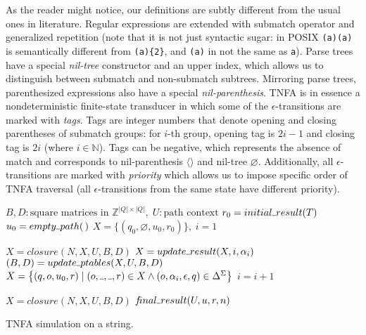 \documentclass[AMA,STIX1COL]{WileyNJD-v2}
\newcommand{\Xm}{\langle\!\rangle}
\newcommand{\Xund}{\rule{.4em}{.4pt}}
\newcommand{\YN}{\mathbb{N}}
\newcommand{\YZ}{\mathbb{Z}}
\begin{document}
As the reader might notice, our definitions are subtly different from the usual ones in literature.
Regular expressions are extended with submatch operator
and generalized repetition (note that it is not just syntactic sugar: in POSIX \texttt{(a)(a)} is semantically different from \texttt{(a)\{2\}},
and \texttt{(a)} in not the same as \texttt{a}).
Parse trees have a special \emph{nil-tree} constructor
and an upper index, which allows us to distinguish between submatch and non-submatch subtrees.
Mirroring parse trees, parenthesized expressions also have a special \emph{nil-parenthesis}.
TNFA is in essence a nondeterministic finite-state transducer
in which some of the $\epsilon$-transitions are marked with \emph{tags}.
Tags are integer numbers that denote opening and closing parentheses of submatch groups:
for $i$-th group, opening tag is $2i - 1$ and closing tag is $2i$ (where $i \in \YN$).
Tags can be negative, which represents the absence of match and corresponds to nil-parenthesis $\Xm$ and nil-tree $\varnothing$.
Additionally, all $\epsilon$-transitions are marked with \emph{priority}
which allows us to impose specific order of TNFA traversal
(all $\epsilon$-transitions from the same state have different priority).
\\

\begin{algorithm}[H] \DontPrintSemicolon {} 
 {

    $B, D : \text{square matrices in } \YZ^{|Q| \times |Q|}, \; U: \text{path context}$ \;
    $r_0 = initial \Xund result(T)$ \;
    $u_0 = empty \Xund path(\,)$ \;
    $X = \big\{ (q_0, \varnothing, u_0, r_0) \big\}, \; i = 1$ \;

    \BlankLine
     {
        $X = closure(N, X, U, B, D)$ \;
        $X = update \Xund result(X, i, \alpha_i)$ \;
        $(B, D) = update \Xund ptables(X, U, B, D)$ \;
        $X = \big\{ (q, o, u_0, r) \mid (o, \Xund, \Xund, r) \in X \wedge (o, \alpha_i, \epsilon, q) \in \Delta^\Sigma \big\}$ \;
        $i = i + 1$ \;
    }

    \BlankLine
    $X = closure(N, X, U, B, D)$ \;
    \If {$(q_f, \Xund, u, r) \in X$} {
        \Return $f\!inal \Xund result (U, u, r, n)$
    } \lElse {
        \Return $\varnothing$
    }
}
\caption{TNFA simulation on a string.}
\end{algorithm}
\medskip
\end{document}
